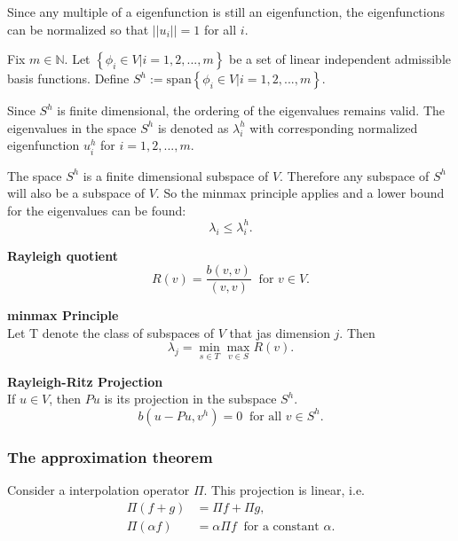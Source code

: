 \documentclass[../../main.tex]{subfiles}
\begin{document}
Since any multiple of a eigenfunction is still an eigenfunction, the eigenfunctions can be normalized so that $||u_i|| = 1$ for all $i$.

Fix $m \in \mathbb{N}$. \label{sym:natural} Let $\left\{ \phi_i \in V | i = 1,2,...,m \right\}$ be a set of linear independent admissible basis functions. Define $S^h := \text{span}\left\{\phi_i \in V | i = 1,2,...,m\right\}$.

Since $S^h$ is finite dimensional, the ordering of the eigenvalues remains valid. The eigenvalues in the space $S^h$ is denoted as $\lambda_i^h$ with corresponding normalized eigenfunction $u^h_i$ for $i = 1,2,...,m$.

The space $S^h$\label{sym:Sh1} is a finite dimensional subspace of $V$. Therefore any subspace of $S^h$ will also be a subspace of $V$. So the minmax principle applies and a lower bound for the eigenvalues can be found:
\begin{equation}
	\lambda_i \leq \lambda_i^h.
\end{equation}

\textbf{Rayleigh quotient}
\begin{equation*}
	R(v) = \frac{b(v,v)}{(v,v)} \ \text { for } v \in V.
\end{equation*} \label{sym:Rayleigh}

\textbf{minmax Principle}\\
Let T denote the class of subspaces of $V$ that jas dimension $j$. Then
\begin{equation*}
	\lambda_j = \min_{s\in T}\max_{v \in S} R(v).
\end{equation*}

\textbf{Rayleigh-Ritz Projection}\\
If $u \in V$, then $Pu$ is its projection in the subspace $S^h$.
\begin{equation*}
	b(u-Pu,v^h) = 0 \ \text{ for all } v \in S^h.
\end{equation*}

\subsubsection{The approximation theorem}

Consider a interpolation operator $\Pi$.\label{sym:interpolation} This projection is linear, i.e.
\begin{align*}
	\Pi(f + g) & = \Pi f + \Pi g,\\
	\Pi(\alpha f) & = \alpha \Pi f \ \text{ for a constant } \alpha. 
\end{align*}
\end{document}
